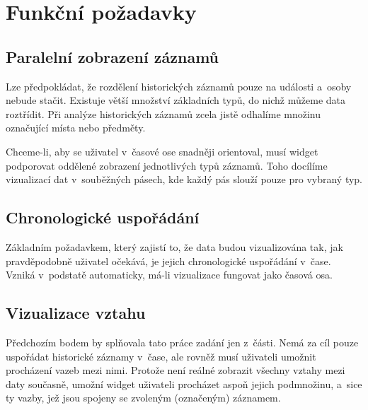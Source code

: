 	\section{Funkční požadavky}
		\label{funkcni-pozadavky}
		
		\subsection*{Paralelní zobrazení záznamů}
			\label{paralelni-zobrazeni-zaznamu}
			Lze předpokládat, že rozdělení historických záznamů pouze na události a~osoby nebude stačit. Existuje větší množství základních typů, do nichž můžeme data roztřídit. Při analýze historických záznamů zcela jistě odhalíme množinu ozna\-čující místa nebo předměty.
			
			Chceme-li, aby se uživatel v~časové ose snadněji orientoval, musí widget podporovat oddělené zobrazení jednotlivých typů záznamů. Toho docílíme vizualizací dat v~souběžných pásech, kde každý pás slouží pouze pro vybraný typ.
			
		\subsection*{Chronologické uspořádání}
			\label{chronologicke-usporadani}
			Základním požadavkem, který zajistí to, že data budou vizualizována tak, jak pravděpodobně uživatel očekává, je jejich chronologické uspořádání v~čase.	Vzni\-ká v~podstatě automaticky, má-li vizualizace fungovat jako časová osa.
			
		\subsection*{Vizualizace vztahu}
			\label{vizualizace-vztahu}
			Předchozím bodem by splňovala tato práce zadání jen z~části. Nemá za cíl pouze uspořádat historické záznamy v~čase, ale rovněž musí uživateli umožnit procházení vazeb mezi nimi. Protože není reálné zobrazit všechny vztahy mezi daty současně, umožní widget uživateli procházet aspoň jejich podmnožinu, a~sice ty vazby, jež jsou spojeny se zvoleným (označeným) záznamem.
		
			
